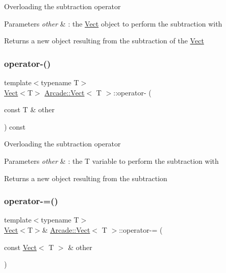 Overloading the subtraction operator 
\begin{DoxyParams}{Parameters}
{\em other} & \+: the \hyperlink{class_arcade_1_1_vect}{Vect} object to perform the subtraction with \\
\hline
\end{DoxyParams}
\begin{DoxyReturn}{Returns}
a new object resulting from the subtraction of the \hyperlink{class_arcade_1_1_vect}{Vect} 
\end{DoxyReturn}
\mbox{\label{class_arcade_1_1_vect_ae519ffdc7a4e3c79f7172df51bdf32c1}} 
\subsubsection{\texorpdfstring{operator-\/()}{operator-()}\hspace{0.1cm}{\footnotesize\ttfamily [2/2]}}
{\footnotesize\ttfamily template$<$typename T$>$ \\
\hyperlink{class_arcade_1_1_vect}{Vect}$<$T$>$ \hyperlink{class_arcade_1_1_vect}{Arcade\+::\+Vect}$<$ T $>$\+::operator-\/ (\begin{DoxyParamCaption}\item[{const T \&}]{other }\end{DoxyParamCaption}) const\hspace{0.3cm}{\ttfamily [inline]}}

Overloading the subtraction operator 
\begin{DoxyParams}{Parameters}
{\em other} & \+: the T variable to perform the subtraction with \\
\hline
\end{DoxyParams}
\begin{DoxyReturn}{Returns}
a new object resulting from the subtraction 
\end{DoxyReturn}
\mbox{\label{class_arcade_1_1_vect_a5e0919a6e98f86643268fd2270436d60}} 
\subsubsection{\texorpdfstring{operator-\/=()}{operator-=()}\hspace{0.1cm}{\footnotesize\ttfamily [1/2]}}
{\footnotesize\ttfamily template$<$typename T$>$ \\
\hyperlink{class_arcade_1_1_vect}{Vect}$<$T$>$\& \hyperlink{class_arcade_1_1_vect}{Arcade\+::\+Vect}$<$ T $>$\+::operator-\/= (\begin{DoxyParamCaption}\item[{const \hyperlink{class_arcade_1_1_vect}{Vect}$<$ T $>$ \&}]{other }\end{DoxyParamCaption})\hspace{0.3cm}{\ttfamily [inline]}}

